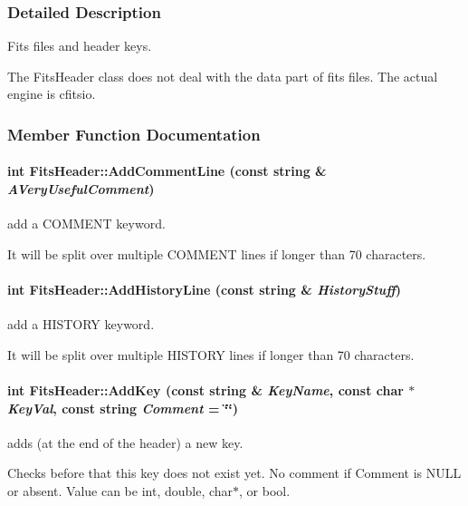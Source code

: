 \subsubsection{Detailed Description}
Fits files and header keys.

The Fits\-Header class does not deal with the data part of fits files. The actual engine is cfitsio. 



\subsubsection{Member Function Documentation}
\paragraph{\setlength{\rightskip}{0pt plus 5cm}int Fits\-Header::Add\-Comment\-Line (const string \& {\em AVery\-Useful\-Comment})}\hfill\label{class_fitsheader_a30}


add a COMMENT keyword.

It will be split over multiple  COMMENT lines if longer than 70 characters. 
\paragraph{\setlength{\rightskip}{0pt plus 5cm}int Fits\-Header::Add\-History\-Line (const string \& {\em History\-Stuff})}\hfill\label{class_fitsheader_a31}


add a HISTORY keyword.

It will be split over multiple  HISTORY lines if longer than 70 characters. 
\paragraph{\setlength{\rightskip}{0pt plus 5cm}int Fits\-Header::Add\-Key (const string \& {\em Key\-Name}, const char $\ast$ {\em Key\-Val}, const string {\em Comment} = \char`\"{}\char`\"{})}\hfill\label{class_fitsheader_a13}


adds (at the end of the header) a new key.

Checks before that this key does not exist yet. No comment if Comment is NULL or absent. Value can be int, double, char$\ast$, or bool. 
